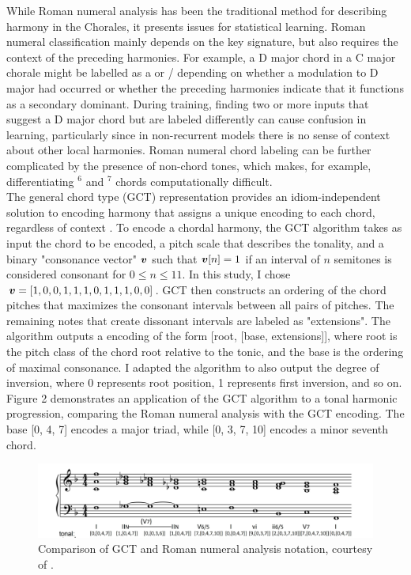 \documentclass[11pt]{article}
\begin{document}
While Roman numeral analysis has been the traditional method for describing harmony in the Chorales, it presents issues for statistical learning. Roman numeral classification mainly depends on the key signature, but also requires the context of the preceding harmonies. For example, a D major chord in a C major chorale might be labelled as a  or / depending on whether a modulation to D major had occurred or whether the preceding harmonies indicate that it functions as a secondary dominant. During training, finding two or more inputs that suggest a D major chord but are labeled differently can cause confusion in learning, particularly since in non-recurrent models there is no sense of context about other local harmonies. Roman numeral chord labeling can be further complicated by the presence of non-chord tones, which makes, for example, differentiating $^6$ and $^7$ chords computationally difficult.\\

The general chord type (GCT) representation provides an idiom-independent solution to encoding harmony that assigns a unique encoding to each chord, regardless of context \citep{2014gct}. To encode a chordal harmony, the GCT algorithm takes as input the chord to be encoded, a pitch scale that describes the tonality, and a binary "consonance vector" $\boldsymbol{v}$ such that $\boldsymbol{v}[n] = 1$ if an interval of $n$ semitones is considered consonant for $0 \leq n \leq 11$. In this study, I chose $\boldsymbol{v} = [1, 0, 0, 1, 1, 1, 0, 1, 1, 1, 0, 0]$.  GCT then constructs an ordering of the chord pitches that maximizes the consonant intervals between all pairs of pitches. The remaining notes that create dissonant intervals are labeled as "extensions". The algorithm outputs a encoding of the form [root, [base, extensions]], where root is the pitch class of the chord root relative to the tonic, and the base is the ordering of maximal consonance. I adapted the algorithm to also output the degree of inversion, where 0 represents root position, 1 represents first inversion, and so on. Figure 2 demonstrates an application of the GCT algorithm to a tonal harmonic progression, comparing the Roman numeral analysis with the GCT encoding. The base [0, 4, 7] encodes a major triad, while [0, 3, 7, 10] encodes a minor seventh chord. \\

\begin{figure}[h]
\begin{center}
\caption{Comparison of GCT and Roman numeral analysis notation, courtesy of \citet{2015gct}.}
\includegraphics[scale=0.54]{GCT}
\end{center}
\end{figure}
\end{document}

